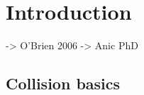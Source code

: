 \cleardoublepage
\chapter{Introduction}
\label{ch01}

-> O'Brien 2006
-> Anic PhD




\section{Collision basics}



